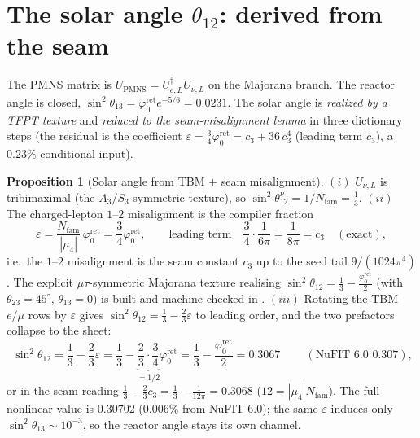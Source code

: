 \documentclass[11pt,a4paper]{article}
\newcommand{\Nfam}{N_{\mathrm{fam}}}
\newcommand{\cthree}{c_3}
\newcommand{\phiz}{\varphi_0^{\mathrm{ret}}}
\theoremstyle{definition}
\newtheorem{proposition}{Proposition}
\begin{document}
\section{The solar angle $\theta_{12}$: derived from the seam}
The PMNS matrix is $U_{\mathrm{PMNS}}=U_{e,L}^\dagger U_{\nu,L}$ on the Majorana branch. The reactor angle
is closed, $\sin^2\theta_{13}=\phiz e^{-5/6}=0.0231$. The solar angle is \emph{realized by a TFPT texture}
and \emph{reduced to the seam-misalignment lemma} in three dictionary steps (the residual is the
coefficient $\varepsilon=\tfrac34\phiz=\cthree+36\,\cthree^4$ (leading term $\cthree$), a $0.23\%$ conditional input).

\begin{proposition}[Solar angle from TBM $+$ seam misalignment]
\label{prop:theta12}
$(i)$ $U_{\nu,L}$ is tribimaximal (the $A_3/S_3$-symmetric texture), so $\sin^2\theta_{12}^\nu=1/\Nfam=\tfrac13$.
$(ii)$ The charged-lepton $1$--$2$ misalignment is the compiler fraction
\[
  \varepsilon=\frac{\Nfam}{|\mu_4|}\,\phiz=\frac34\phiz,\qquad\text{leading term}\quad
  \frac34\cdot\frac1{6\pi}=\frac1{8\pi}=\cthree\quad(\text{exact}),
\]
i.e.\ the $1$--$2$ misalignment is the seam constant $\cthree$ up to the seed tail $9/(1024\pi^4)$.
The explicit $\mu\tau$-symmetric Majorana texture realising $\sin^2\theta_{12}=\tfrac13-\tfrac{\phiz}2$ (with
$\theta_{23}=45^\circ$, $\theta_{13}=0$) is built and machine-checked in .
$(iii)$ Rotating the TBM $e/\mu$ rows by $\varepsilon$ gives $\sin^2\theta_{12}=\tfrac13-\tfrac23\varepsilon$
to leading order, and the two prefactors collapse to the sheet:
\[
  \boxed{\ \sin^2\theta_{12}=\frac13-\frac23\varepsilon=\frac13-\underbrace{\frac23\!\cdot\!\frac34}_{=1/2}\phiz
  =\frac13-\frac{\phiz}{2}=0.3067\ }\qquad(\text{NuFIT 6.0 }0.307),
\]
or in the seam reading $\tfrac13-\tfrac23\cthree=\tfrac13-\tfrac1{12\pi}=0.3068$ ($12=|\mu_4|\Nfam$). The
full nonlinear value is $0.30702$ ($0.006\%$ from NuFIT 6.0); the same $\varepsilon$ induces only
$\sin^2\theta_{13}\sim10^{-3}$, so the reactor angle stays its own channel.
\end{proposition}
\end{document}
